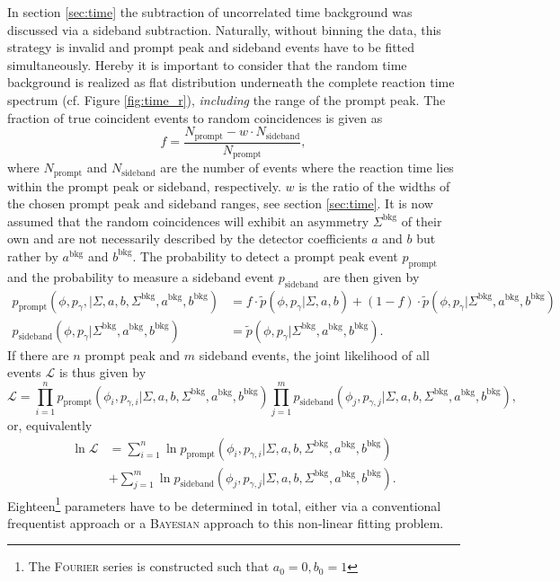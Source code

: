 In section \ref{sec:time} the subtraction of uncorrelated time background was discussed via a sideband subtraction. Naturally, without binning the data, this strategy is invalid and prompt peak and sideband events have to be fitted simultaneously. Hereby it is important to consider that the random time background is realized as flat distribution underneath the complete reaction time spectrum (cf. Figure \ref{fig:time_r}), \emph{including} the range of the prompt peak. The fraction of true coincident events to random coincidences is given as \begin{equation}
	f=\frac{N_\text{prompt}-w\cdot N_\text{sideband}}{N_\text{prompt}},
\end{equation}
where $N_\text{prompt}$ and $N_\text{sideband}$ are the number of events where the reaction time lies within the prompt peak or sideband, respectively. $w$ is the ratio of the widths of the chosen prompt peak and sideband
ranges, see section \ref{sec:time}. It is now assumed that the random coincidences will exhibit an asymmetry $\Sigma^\text{bkg}$ of their own and are not necessarily described by the detector coefficients $a$ and $b$ but rather by $a^\text{bkg}$ and $b^\text{bkg}$. The probability to detect a prompt peak event $p_\text{prompt}$ and the probability to measure a sideband event $p_\text{sideband}$ are then given by 
\begin{align}
p_\text{prompt}\left(\phi,p_\gamma,\big|\Sigma,a,b,\Sigma^\text{bkg},a^\text{bkg},b^\text{bkg}\right)&=f\cdot\tilde{p}\left(\phi,p_\gamma\big|\Sigma,a,b\right)+\left(1-f\right)\cdot\tilde{p}\left(\phi,p_\gamma\big|\Sigma^\text{bkg},a^\text{bkg},b^\text{bkg}\right)\label{eq:pprmpt}\\
p_\text{sideband}\left(\phi,p_\gamma\big|\Sigma^\text{bkg},a^\text{bkg},b^\text{bkg}\right)&=\tilde{p}\left(\phi,p_\gamma\big|\Sigma^\text{bkg},a^\text{bkg},b^\text{bkg}\right)\label{eq:pside}.
\end{align}
If there are $n$ prompt peak and $m$ sideband events, the joint likelihood of all events $\mathcal{L}$ is thus given by
\begin{equation}
	\mathcal{L}=\prod_{i=1}^{n}p_\text{prompt}\left(\phi_i,p_{\gamma,i}\big|\Sigma,a,b,\Sigma^\text{bkg},a^\text{bkg},b^\text{bkg}\right)\prod_{j=1}^mp_\text{sideband}\left(\phi_j,p_{\gamma,j}\big|\Sigma,a,b,\Sigma^\text{bkg},a^\text{bkg},b^\text{bkg}\right),
\end{equation}
or, equivalently
\begin{equation}
\begin{aligned}
	\ln\mathcal{L}&=\sum_{i=1}^{n}\ln p_\text{prompt}\left(\phi_i,p_{\gamma,i}\big|\Sigma,a,b,\Sigma^\text{bkg},a^\text{bkg},b^\text{bkg}\right)\\&+\sum_{j=1}^m \ln p_\text{sideband}\left(\phi_j,p_{\gamma,j}\big|\Sigma,a,b,\Sigma^\text{bkg},a^\text{bkg},b^\text{bkg}\right).\label{eq:lik}
\end{aligned}
\end{equation}
Eighteen\footnote{The \textsc{Fourier} series is constructed such that $a_0=0,b_0=1$} parameters have to be determined in total, either via a conventional frequentist approach or a \textsc{Bayesian} approach to this non-linear fitting problem.
